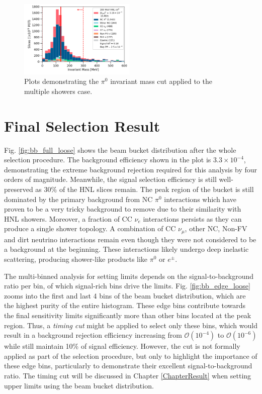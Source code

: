 \begin{figure}[h!]
        \centering 
        \includegraphics[width=0.495\textwidth]{pizero_mass_precut}
	\caption{
	Plots demonstrating the $\pi^0$ invariant mass cut applied to the multiple showers case.
	}
        \label{fig:mass_cut}
\end{figure}

\section{Final Selection Result}
\label{sec:select_result}

Fig. \ref{fig:bb_full_loose} shows the beam bucket distribution after the whole selection procedure.
The background efficiency shown in the plot is $3.3 \times 10^{-4}$, demonstrating the extreme background rejection required for this analysis by four orders of magnitude.
Meanwhile, the signal selection efficiency is still well-preserved as $30\%$ of the HNL slices remain. 
The peak region of the bucket is still dominated by the primary background from NC $\pi^0$ interactions which have proven to be a very tricky background to remove due to their similarity with HNL showers.
Moreover, a fraction of CC $\nu_e$ interactions persists as they can produce a single shower topology. 
A combination of CC $\nu_\mu$, other NC, Non-FV and dirt neutrino interactions remain even though they were not considered to be a background at the beginning.
These interactions likely undergo deep inelastic scattering, producing shower-like products like $\pi^0$ or $e^{\pm}$.

The multi-binned analysis for setting limits depends on the signal-to-background ratio per bin, of which signal-rich bins drive the limits.
Fig. \ref{fig:bb_edge_loose} zooms into the first and last 4 bins of the beam bucket distribution, which are the highest purity of the entire histogram.
These edge bins contribute towards the final sensitivity limits significantly more than other bins located at the peak region. 
Thus, a \textit{timing cut} might be applied to select only these bins, which would result in a background rejection efficiency increasing from $\mathcal{O}(10^{-4})$ to $\mathcal{O}(10^{-6})$ while still maintain 10\% of signal efficiency.
However, the cut is not formally applied as part of the selection procedure, but only to highlight the importance of these edge bins, particularly to demonstrate their excellent signal-to-background ratio.
The timing cut will be discussed in Chapter \ref{ChapterResult} when setting upper limits using the beam bucket distribution.


